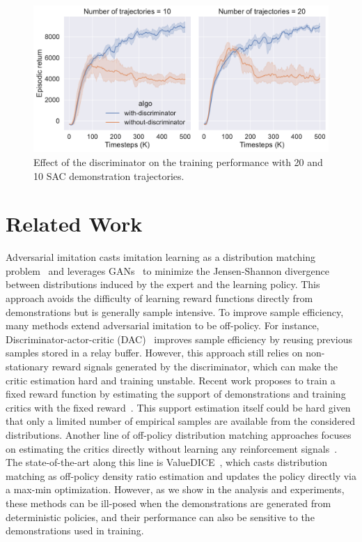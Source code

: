 \documentclass[letterpaper]{article} %
\begin{document}
\begin{figure}
    \centering
    \includegraphics[width=0.9\linewidth]{ablation.pdf}
    \caption{Effect of the discriminator on the training performance with 20 and 10 SAC demonstration trajectories.}
    \label{fig:ablation-discriminator}
\end{figure}


\section{Related Work}
Adversarial imitation casts imitation learning as a distribution matching problem~\cite{ho2016generative} and leverages GANs~\cite{goodfellow2014generative} to minimize the Jensen-Shannon divergence between distributions induced by the expert and the learning policy.
This approach avoids the difficulty of learning reward functions directly from demonstrations but is generally sample intensive.
To improve sample efficiency, many methods extend adversarial imitation to be off-policy.
For instance, Discriminator-actor-critic (DAC)~\cite{kostrikov2018discriminator,sasaki2018sample} improves sample efficiency by reusing previous samples stored in a relay buffer.
However, this approach still relies on non-stationary reward signals generated by the discriminator, which can make the critic estimation hard and training unstable.
Recent work proposes to train a fixed reward function by estimating the support of demonstrations and training  critics with the fixed reward~\cite{wang2019random}.
This support estimation itself could be hard given that only a limited number of empirical samples are available from the considered distributions.
Another line of off-policy distribution matching approaches focuses on estimating the critics directly without learning any reinforcement signals~\cite{sasaki2018sample,kostrikov2019imitation}.
The state-of-the-art along this line is  ValueDICE~\cite{kostrikov2019imitation}, which casts distribution matching as off-policy density ratio estimation and updates the policy directly via a max-min optimization.
However, as we show in the analysis and experiments, these methods can be ill-posed when the demonstrations are generated from deterministic policies, and their performance can also be sensitive to the demonstrations used in training.
\end{document}
